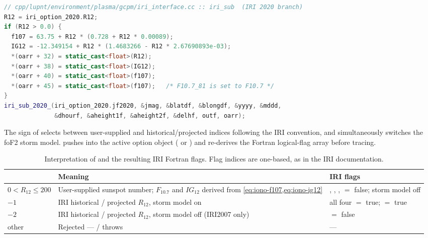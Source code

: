 \begin{lstlisting}[language=cpp, caption={PHaRLAP solar-index relations and the
IRI user-input path.  Source:
\texttt{cpp/lupnt/environment/plasma/gcpm/iri\_interface.cc} ::
\code{iri\_sub}.}, label={lst:iono-indices}]
// cpp/lupnt/environment/plasma/gcpm/iri_interface.cc :: iri_sub  (IRI 2020 branch)
R12 = iri_option_2020.R12;
if (R12 > 0.0) {
  f107 = 63.75 + R12 * (0.728 + R12 * 0.00089);
  IG12 = -12.349154 + R12 * (1.4683266 - R12 * 2.67690893e-03);
  *(oarr + 32) = static_cast<float>(R12);
  *(oarr + 38) = static_cast<float>(IG12);
  *(oarr + 40) = static_cast<float>(f107);
  *(oarr + 45) = static_cast<float>(f107);   /* F10.7_81 is set to F10.7 */
}
iri_sub_2020_(iri_option_2020.jf2020, &jmag, &blatdf, &blongdf, &yyyy, &mddd,
              &dhourf, &aheight1f, &aheight2f, &delhf, outf, oarr);
\end{lstlisting}

The sign of  selects between user-supplied and
historical/projected indices following the IRI convention, and simultaneously
switches the foF2 storm model.   pushes  into
the active option object ( or ) and
re-derives the Fortran logical-flag array  before tracing.

\begin{table}[htbp]
  \centering
  \caption{Interpretation of  and the resulting IRI
  Fortran flags.  Flag indices are one-based, as in the IRI documentation.}
  \label{tab:iono-rz12}
  \small
  \begin{tabularx}{\textwidth}{lLl}
    \toprule
     & Meaning & IRI flags \\
    \midrule
    $0 < R_{12} \le 200$ & User-supplied sunspot number; $F_{10.7}$ and $IG_{12}$ derived from \cref{eq:iono-f107,eq:iono-ig12} & , , ,  $=$ false; storm model off \\
    $-1$ & IRI historical / projected $R_{12}$, storm model on & all four $=$ true;  $=$ true \\
    $-2$ & IRI historical / projected $R_{12}$, storm model off (IRI2007 only) &  $=$ false \\
    other & Rejected ---  /  throws  & --- \\
    \bottomrule
  \end{tabularx}
\end{table}

